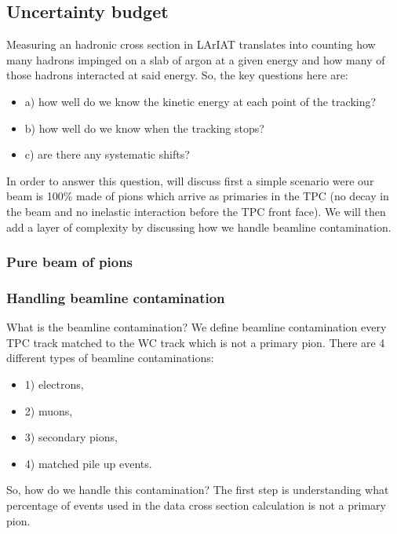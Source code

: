 {\subsection{Uncertainty budget}
Measuring an hadronic cross section  in LArIAT translates into counting how many hadrons impinged on a slab of argon at a given energy and how many of those hadrons interacted at said energy. So, the key questions here are:
\begin{itemize}
\item[]a) how well do we know the kinetic energy at each point of the tracking? %
\item[]b) how well do we know when the tracking stops? %
\item[]c) are there any systematic shifts?
\end{itemize}

In order to answer this question, will discuss first a simple scenario  were our beam is 100\% made of pions which arrive as primaries in the TPC (no decay in the beam and no inelastic interaction before the TPC front face). We will then add a layer of complexity by discussing how we handle beamline contamination.
\subsubsection{Pure beam of pions}
\subsubsection{Handling beamline contamination}
What is the beamline contamination? We define beamline contamination every TPC track matched to the WC track which is not a primary pion. There are 4 different types of beamline contaminations:
\begin{itemize}
\item[]1) electrons,
\item[]2) muons,
\item[]3) secondary pions,
\item[]4) matched pile up events.
\end{itemize}
So, how do we handle this contamination?
The first step is understanding what percentage of events used in the data cross section calculation is not a primary pion. 

}
